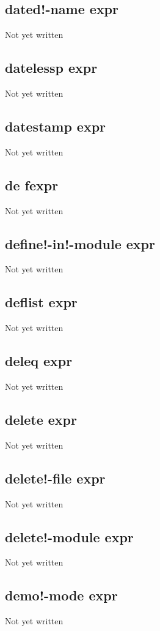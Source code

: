 \documentclass[a4paper,11pt]{article}
\begin{document}
\subsection{\ttfamily dated!-name expr}
Not yet written

\subsection{\ttfamily datelessp expr}
Not yet written

\subsection{\ttfamily datestamp expr}
Not yet written

\subsection{\ttfamily de fexpr}
Not yet written

\subsection{\ttfamily define!-in!-module expr}
Not yet written

\subsection{\ttfamily deflist expr}
Not yet written

\subsection{\ttfamily deleq expr}
Not yet written

\subsection{\ttfamily delete expr}
Not yet written

\subsection{\ttfamily delete!-file expr}
Not yet written

\subsection{\ttfamily delete!-module expr}
Not yet written

\subsection{\ttfamily demo!-mode expr}
Not yet written
\end{document}
